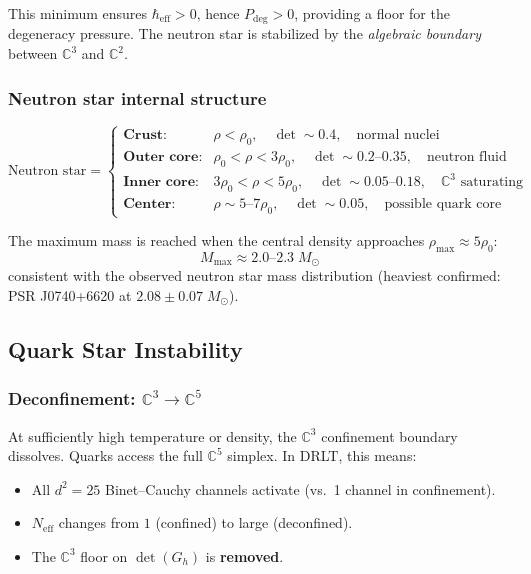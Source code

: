\documentclass[12pt]{article}
\theoremstyle{remark}
\theoremstyle{definition}
\newcommand{\CC}{\mathbb{C}}
\begin{document}
This minimum ensures $\hbar_\text{eff} > 0$, hence $P_\text{deg} > 0$, providing a floor for the degeneracy pressure. The neutron star is stabilized by the \emph{algebraic boundary} between $\CC^3$ and $\CC^2$.

\subsubsection{Neutron star internal structure}

\begin{equation}
\text{Neutron star} = \begin{cases}
\textbf{Crust:} & \rho < \rho_0, \quad \det \sim 0.4, \quad \text{normal nuclei} \\
\textbf{Outer core:} & \rho_0 < \rho < 3\rho_0, \quad \det \sim 0.2\text{--}0.35, \quad \text{neutron fluid} \\
\textbf{Inner core:} & 3\rho_0 < \rho < 5\rho_0, \quad \det \sim 0.05\text{--}0.18, \quad \text{$\CC^3$ saturating} \\
\textbf{Center:} & \rho \sim 5\text{--}7\rho_0, \quad \det \sim 0.05, \quad \text{possible quark core}
\end{cases}
\end{equation}

The maximum mass is reached when the central density approaches $\rho_\text{max} \approx 5\rho_0$:
\begin{equation}
M_\text{max} \approx 2.0\text{--}2.3\;M_\odot
\end{equation}
consistent with the observed neutron star mass distribution (heaviest confirmed: PSR J0740+6620 at $2.08 \pm 0.07\;M_\odot$).

\subsection{Quark Star Instability}

\subsubsection{Deconfinement: $\CC^3 \to \CC^5$}

At sufficiently high temperature or density, the $\CC^3$ confinement boundary dissolves. Quarks access the full $\CC^5$ simplex. In DRLT, this means:
\begin{itemize}
\item All $d^2 = 25$ Binet--Cauchy channels activate (vs.\ 1 channel in confinement).
\item $N_\text{eff}$ changes from $1$ (confined) to large (deconfined).
\item The $\CC^3$ floor on $\det(G_h)$ is \textbf{removed}.
\end{itemize}
\end{document}
